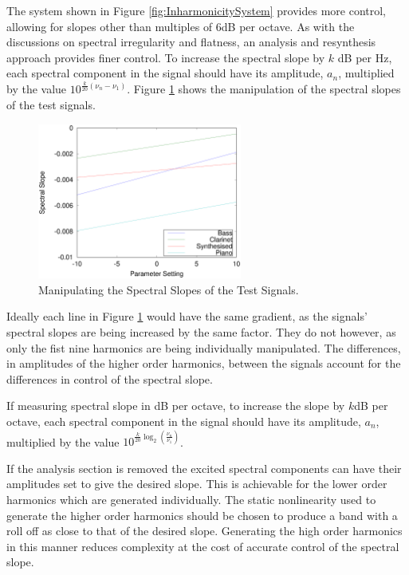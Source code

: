			The system shown in Figure \ref{fig:InharmonicitySystem} provides more control, allowing for slopes
			other than multiples of 6dB per octave. As with the discussions on spectral irregularity and
			flatness, an analysis and resynthesis approach provides finer control.  To increase the spectral
			slope by $k$ dB per Hz, each spectral component in the signal should have its amplitude, $a_{n}$,
			multiplied by the value $10^{\frac{k}{20}(\nu_{n} - \nu_{1})}$. Figure \ref{fig:MoveSlopes} shows
			the manipulation of the spectral slopes of the test signals.

			\begin{figure}[h!]
				\centering
				\includegraphics[width=0.6\textwidth]{chapter6/Images/MoveSlopes.eps}
				\caption{Manipulating the Spectral Slopes of the Test Signals.}
				\label{fig:MoveSlopes}
			\end{figure}

			Ideally each line in Figure \ref{fig:MoveSlopes} would have the same gradient, as the signals'
			spectral slopes are being increased by the same factor. They do not however, as only the fist nine
			harmonics are being individually manipulated. The differences, in amplitudes of the higher order
			harmonics, between the signals account for the differences in control of the spectral slope.

			If measuring spectral slope in dB per octave, to increase the slope by $k$dB per octave, each
			spectral component in the signal should have its amplitude, $a_{n}$, multiplied by the value
			$10^{\frac{k}{20}\log_{2} \left( \frac{\nu_{n}}{\nu_{1}} \right)}$.

			If the analysis section is removed the excited spectral components can have their amplitudes set to
			give the desired slope. This is achievable for the lower order harmonics which are generated
			individually.  The static nonlinearity used to generate the higher order harmonics should be chosen
			to produce a band with a roll off as close to that of the desired slope. Generating the high order
			harmonics in this manner reduces complexity at the cost of accurate control of the spectral slope.

